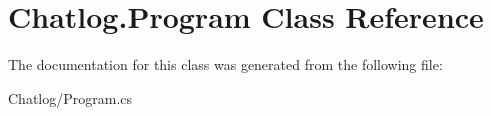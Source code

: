 \hypertarget{class_chatlog_1_1_program}{\section{Chatlog.\-Program Class Reference}
\label{class_chatlog_1_1_program}
}


The documentation for this class was generated from the following file\-:\begin{DoxyCompactItemize}
\item 
Chatlog/Program.\-cs\end{DoxyCompactItemize}
